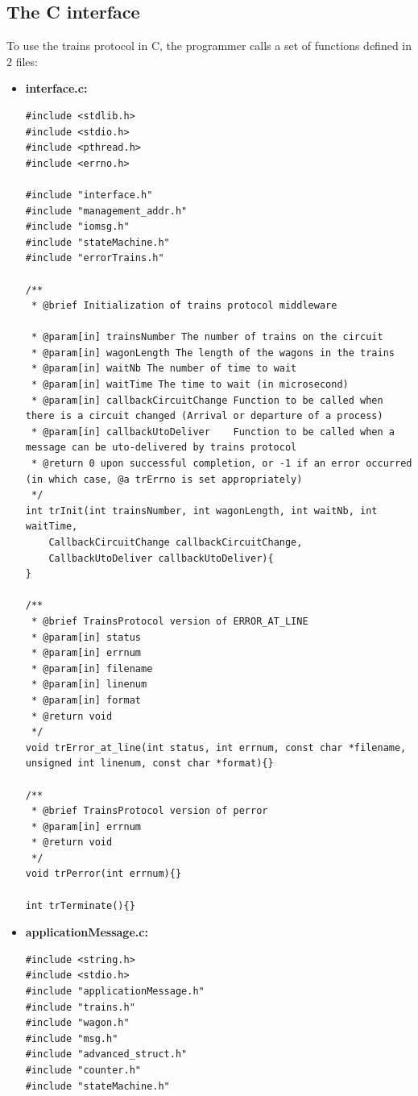 \documentclass[a4paper,10pt]{report}
\begin{document}
\subsection{The C interface}

To use the trains protocol in C, the programmer calls a set of functions defined in 2 files:
\begin{itemize}
  \item \textbf{interface.c:}\\ 

\lstset{language=C}
\lstset{commentstyle=\textit} 
\begin{lstlisting}
#include <stdlib.h>
#include <stdio.h>
#include <pthread.h>
#include <errno.h>

#include "interface.h"
#include "management_addr.h"
#include "iomsg.h"
#include "stateMachine.h"
#include "errorTrains.h"

/**
 * @brief Initialization of trains protocol middleware

 * @param[in] trainsNumber The number of trains on the circuit
 * @param[in] wagonLength The length of the wagons in the trains
 * @param[in] waitNb The number of time to wait
 * @param[in] waitTime The time to wait (in microsecond)
 * @param[in] callbackCircuitChange Function to be called when there is a circuit changed (Arrival or departure of a process)
 * @param[in] callbackUtoDeliver    Function to be called when a message can be uto-delivered by trains protocol
 * @return 0 upon successful completion, or -1 if an error occurred (in which case, @a trErrno is set appropriately)
 */
int trInit(int trainsNumber, int wagonLength, int waitNb, int waitTime,
    CallbackCircuitChange callbackCircuitChange,
    CallbackUtoDeliver callbackUtoDeliver){
}

/**
 * @brief TrainsProtocol version of ERROR_AT_LINE
 * @param[in] status
 * @param[in] errnum
 * @param[in] filename
 * @param[in] linenum
 * @param[in] format
 * @return void
 */
void trError_at_line(int status, int errnum, const char *filename, unsigned int linenum, const char *format){}

/**
 * @brief TrainsProtocol version of perror
 * @param[in] errnum
 * @return void
 */
void trPerror(int errnum){}

int trTerminate(){}
\end{lstlisting}

  \item \textbf{applicationMessage.c:}\\
\lstset{language=C}
\lstset{commentstyle=\textit} 
\begin{lstlisting}
#include <string.h>
#include <stdio.h>
#include "applicationMessage.h"
#include "trains.h"
#include "wagon.h"
#include "msg.h"
#include "advanced_struct.h"
#include "counter.h"
#include "stateMachine.h"


\end{lstlisting}
\end{itemize}
\end{document}
